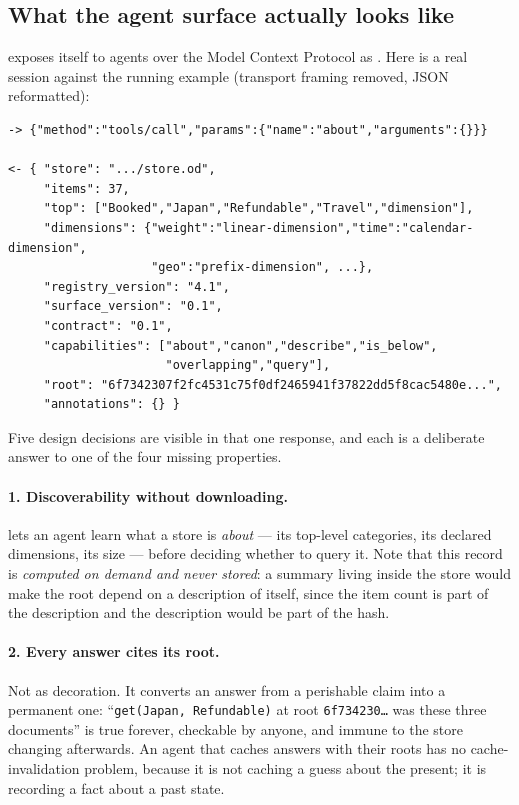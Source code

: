 \subsection{What the agent surface actually looks like}

\odag{} exposes itself to agents over the Model Context Protocol
\citep{mcp2024} as . Here is a real session against the running
example (transport framing removed, JSON reformatted):

\begin{lstlisting}
-> {"method":"tools/call","params":{"name":"about","arguments":{}}}

<- { "store": ".../store.od",
     "items": 37,
     "top": ["Booked","Japan","Refundable","Travel","dimension"],
     "dimensions": {"weight":"linear-dimension","time":"calendar-dimension",
                    "geo":"prefix-dimension", ...},
     "registry_version": "4.1",
     "surface_version": "0.1",
     "contract": "0.1",
     "capabilities": ["about","canon","describe","is_below",
                      "overlapping","query"],
     "root": "6f7342307f2fc4531c75f0df2465941f37822dd5f8cac5480e...",
     "annotations": {} }
\end{lstlisting}

Five design decisions are visible in that one response, and each is a
deliberate answer to one of the four missing properties.

\paragraph{1. Discoverability without downloading.}  lets an agent
learn what a store is \emph{about} --- its top-level categories, its declared
dimensions, its size --- before deciding whether to query it. Note that this
record is \emph{computed on demand and never stored}: a summary living inside
the store would make the root depend on a description of itself, since the
item count is part of the description and the description would be part of the
hash.

\paragraph{2. Every answer cites its root.} Not as decoration. It converts an
answer from a perishable claim into a permanent one: ``\texttt{get(Japan,
Refundable)} at root \texttt{6f734230\ldots} was these three documents'' is
true forever, checkable by anyone, and immune to the store changing
afterwards. An agent that caches answers with their roots has no
cache-invalidation problem, because it is not caching a guess about the
present; it is recording a fact about a past state.

